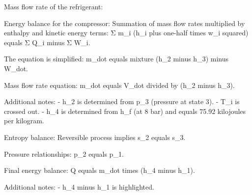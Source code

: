Mass flow rate of the refrigerant:  

Energy balance for the compressor:  
Summation of mass flow rates multiplied by enthalpy and kinetic energy terms:  
Σ m_i (h_i plus one-half times w_i squared) equals Σ Q_i minus Σ W_i.  

The equation is simplified:  
m_dot equals mixture (h_2 minus h_3) minus W_dot.  

Mass flow rate equation:  
m_dot equals V_dot divided by (h_2 minus h_3).  

Additional notes:  
- h_2 is determined from p_3 (pressure at state 3).  
- T_i is crossed out.  
- h_4 is determined from h_f (at 8 bar) and equals 75.92 kilojoules per kilogram.  

Entropy balance:  
Reversible process implies s_2 equals s_3.  

Pressure relationships:  
p_2 equals p_1.  

Final energy balance:  
Q equals m_dot times (h_4 minus h_1).  

Additional notes:  
- h_4 minus h_1 is highlighted.